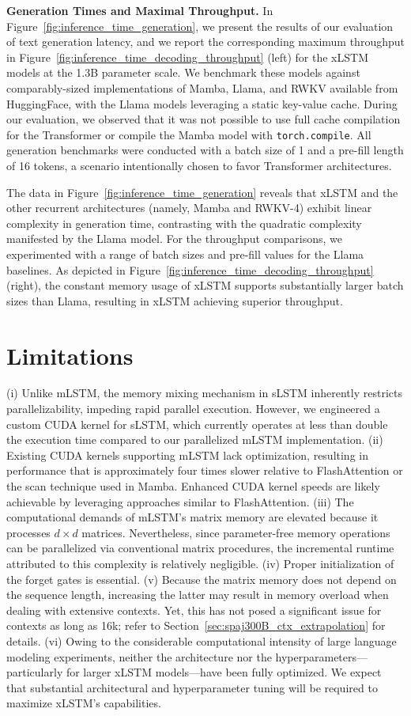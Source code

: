 \textbf{Generation Times and Maximal Throughput.} In Figure~\ref{fig:inference_time_generation}, we present the results of our evaluation of text generation latency, and we report the corresponding maximum throughput in Figure~\ref{fig:inference_time_decoding_throughput} (left) for the xLSTM models at the 1.3B parameter scale. We benchmark these models against comparably-sized implementations of Mamba, Llama, and RWKV available from HuggingFace, with the Llama models leveraging a static key-value cache. During our evaluation, we observed that it was not possible to use full cache compilation for the Transformer or compile the Mamba model with \texttt{torch.compile}. All generation benchmarks were conducted with a batch size of 1 and a pre-fill length of 16 tokens, a scenario intentionally chosen to favor Transformer architectures.

The data in Figure~\ref{fig:inference_time_generation} reveals that xLSTM and the other recurrent architectures (namely, Mamba and RWKV-4) exhibit linear complexity in generation time, contrasting with the quadratic complexity manifested by the Llama model. For the throughput comparisons, we experimented with a range of batch sizes and pre-fill values for the Llama baselines. As depicted in Figure~\ref{fig:inference_time_decoding_throughput} (right), the constant memory usage of xLSTM supports substantially larger batch sizes than Llama, resulting in xLSTM achieving superior throughput.

\section{Limitations}

(i) Unlike mLSTM, the memory mixing mechanism in sLSTM inherently restricts parallelizability, impeding rapid parallel execution. However, we engineered a custom CUDA kernel for sLSTM, which currently operates at less than double the execution time compared to our parallelized mLSTM implementation. (ii) Existing CUDA kernels supporting mLSTM lack optimization, resulting in performance that is approximately four times slower relative to FlashAttention or the scan technique used in Mamba. Enhanced CUDA kernel speeds are likely achievable by leveraging approaches similar to FlashAttention. (iii) The computational demands of mLSTM’s matrix memory are elevated because it processes $d \times d$ matrices. Nevertheless, since parameter-free memory operations can be parallelized via conventional matrix procedures, the incremental runtime attributed to this complexity is relatively negligible. (iv) Proper initialization of the forget gates is essential. (v) Because the matrix memory does not depend on the sequence length, increasing the latter may result in memory overload when dealing with extensive contexts. Yet, this has not posed a significant issue for contexts as long as 16k; refer to Section~\ref{sec:spaj300B_ctx_extrapolation} for details. (vi) Owing to the considerable computational intensity of large language modeling experiments, neither the architecture nor the hyperparameters—particularly for larger xLSTM models—have been fully optimized. We expect that substantial architectural and hyperparameter tuning will be required to maximize xLSTM’s capabilities.


